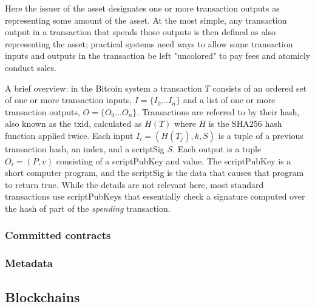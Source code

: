 \documentclass{article}
\begin{document}
Here the issuer of the asset designates one or more transaction outputs as
representing some amount of the asset. At the most simple, any transaction
output in a transaction that spends those outputs is then defined as also
representing the asset; practical systems need ways to allow some transaction
inputs and outputs in the transaction be left "uncolored" to pay fees and
atomicly conduct sales.




A brief overview: in the Bitcoin system a transaction $T$ consists of an
ordered set of one or more transaction inputs, $I=\{I_0 ... I_n\}$ and a list
of one or more transaction outputs, $O=\{O_0 ... O_n\}$. Transactions are
referred to by their hash, also known as the $\mathrm{txid}$, calculated as
$H(T)$ where $H$ is the SHA256 hash function applied twice. Each input $I_i =
(H(T_j), k, S)$ is a tuple of a previous transaction hash, an index, and a
scriptSig $S$. Each output is a tuple $O_i = (P, v)$ consisting of a
scriptPubKey and value. The scriptPubKey is a short computer program, and the
scriptSig is the data that causes that program to return true. While the
details are not relevant here, most standard transactions use scriptPubKeys
that essentially check a signature computed over the hash of part of the
\emph{spending} transaction.



\subsubsection{Committed contracts}



\subsubsection{Metadata}


\subsection{Blockchains}




\end{document}
